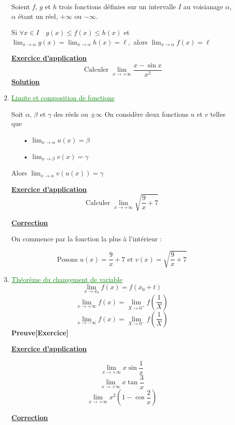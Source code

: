 \documentclass[12pt]{article}
\begin{document}
\begin{enumerate}[label=\arabic*)]
\begin{enumerate}[label=\alph*)]
Soient \( f \), \( g \) et \( h \) trois fonctions définies sur un intervalle \( I \) au voisianage \( \alpha \), \( \alpha \) étant un réel, \( +\infty \) ou \( -\infty \).

Si \( \forall x\in I \quad g(x) \leq f(x)\leq h(x) \) et \( \lim_{x \to \alpha}g(x)=\lim_{x \to \alpha}h(x)=\ell,\) alors \( \lim_{x \to \alpha}f(x)=\ell \)
       	
       	\textbf{\underline{Exercice d'application}}
\[\text{ Calculer } \lim_{ x\to +\infty} \frac{x-\sin x}{x^{2}} \]   	
       	\textbf{\underline{Solution}}
       	
\item \textcolor{green}{\underline{Limite et composition de fonctions}}

Soit \( \alpha \), \( \beta \) et \( \gamma \) des réels ou \( \pm\infty \) On considère deux fonctions \( u \) et \( v \) telles que
\begin{itemize}
\item[•] \( \lim_{x \to \alpha}u(x)=\beta  \)
\item[•] \( \lim_{x \to \beta}v(x)=\gamma \)
\end{itemize}

Alors \( \lim_{x \to \alpha}v(u(x))=\gamma \) 	
	
       	\textbf{\underline{Exercice d'application}}	
\[\text{Calculer }\lim_{x \to +\infty}\sqrt{\frac{9}{x}+7} \]

				\textbf{\underline{Correction}}
				
On commence par la fonction la plus à l'intérieur :

\[\text{Posons } u(x)=\frac{9}{x}+7 \text{ et } v(x)=\sqrt{\frac{9}{x}+7} \]
       	\item \textcolor{green}{\underline{Théorème du changement de variable}}
       	\[ \lim_{x \to x_{0}}f(x)=f(x_{0}+t) \]
      	\[ \lim_{x \to +\infty}f(x)=\lim_{X \to 0^{+}}f \left( \frac{1}{X} \right)  \]
       	\[ \lim_{x \to -\infty}f(x)=\lim_{X \to 0^{-}}f \left( \frac{1}{X} \right)  \]
       	\textbf{Preuve[Exercice]}    	
			       		
      	\textbf{\underline{Exercice d'application}}

				 \[ \lim_{x \to +\infty}x\sin \frac{1}{x} \] 
				 \[ \lim_{x \to +\infty}x\tan \frac{3}{x} \] 
				 \[ \lim_{x \to +\infty}x^{2}\left( 1 - \cos \frac{2}{x} \right) \] 	

				\textbf{\underline{Correction}}       	


\end{enumerate}
\end{enumerate}
\end{document}
